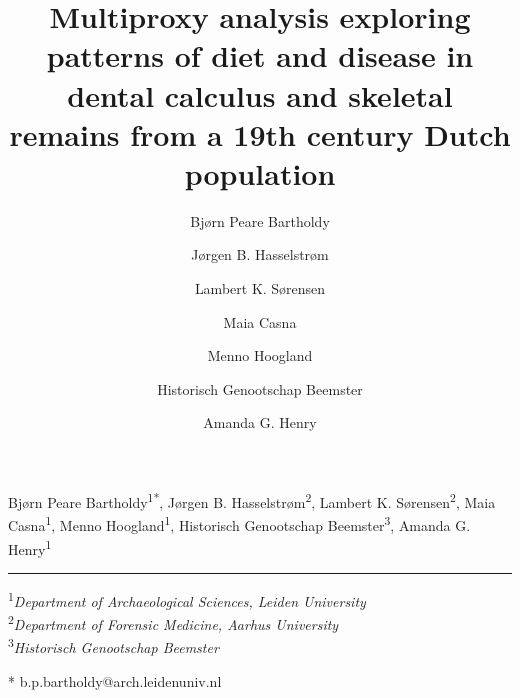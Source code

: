 \documentclass[
]{article}
\title{Multiproxy analysis exploring patterns of diet and disease in
dental calculus and skeletal remains from a 19th century Dutch
population}
\author{Bjørn Peare Bartholdy \and Jørgen B. Hasselstrøm \and Lambert K.
Sørensen \and Maia Casna \and Menno Hoogland \and Historisch Genootschap
Beemster \and Amanda G. Henry}
\date{}
\begin{document}

\maketitle

\begin{center}

\thispagestyle{fancy}


\normalsize{Bjørn Peare
Bartholdy}\textsuperscript{1*}, \normalsize{Jørgen B.
Hasselstrøm}\textsuperscript{2}, \normalsize{Lambert K.
Sørensen}\textsuperscript{2}, \normalsize{Maia
Casna}\textsuperscript{1}, \normalsize{Menno
Hoogland}\textsuperscript{1}, \normalsize{Historisch Genootschap
Beemster}\textsuperscript{3}, \normalsize{Amanda G.
Henry}\textsuperscript{1}\vspace{12pt}

\rule{\textwidth}{1.8pt}\vspace{8pt}

\end{center}

\textsuperscript{\footnotesize{1}}\textit{\small{Department of
Archaeological Sciences, Leiden
University}}\\ \textsuperscript{\footnotesize{2}}\textit{\small{Department
of Forensic Medicine, Aarhus
University}}\\ \textsuperscript{\footnotesize{3}}\textit{\small{Historisch
Genootschap Beemster}}

* \small{b.p.bartholdy@arch.leidenuniv.nl}

\vspace{12pt}
\end{document}

